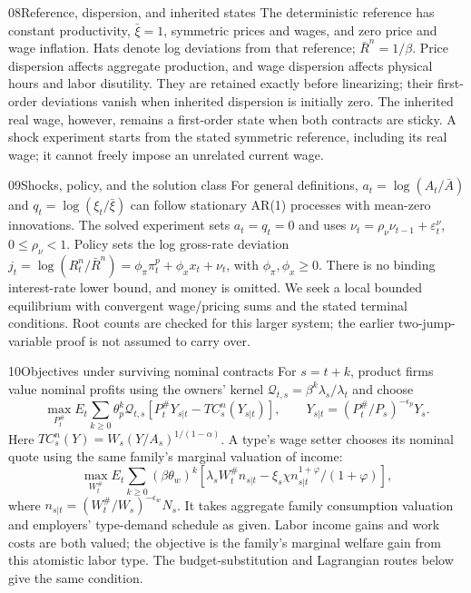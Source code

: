 \begin{modelsetup}[1]
\begin{modelcondition}{08}{Reference, dispersion, and inherited states}
The deterministic reference has constant productivity, $\bar\xi=1$, symmetric
prices and wages, and zero price and wage inflation. Hats denote log deviations
from that reference; $\bar R^n=1/\beta$. Price dispersion affects aggregate
production, and wage dispersion affects physical hours and labor disutility.
They are retained exactly before linearizing; their first-order deviations
vanish when inherited dispersion is initially zero. The inherited real wage,
however, remains a first-order state when both contracts are sticky. A shock
experiment starts from the stated symmetric reference, including its real wage;
it cannot freely impose an unrelated current wage.
\end{modelcondition}
\end{modelsetup}

\begin{modelsetup}[1]
\begin{modelcondition}{09}{Shocks, policy, and the solution class}
For general definitions, $a_t=\log(A_t/\bar A)$ and
$q_t=\log(\xi_t/\bar\xi)$ can follow stationary AR(1) processes with mean-zero
innovations. The solved experiment sets $a_t=q_t=0$ and uses
$\nu_t=\rho_\nu\nu_{t-1}+\varepsilon_t^\nu$, $0\leq\rho_\nu<1$.
Policy sets the log gross-rate deviation
$j_t=\log(R_t^n/\bar R^n)=\phi_\pi\pi_t^p+\phi_xx_t+\nu_t$, with
$\phi_\pi,\phi_x\geq0$. There is no binding interest-rate lower bound, and money
is omitted. We seek a local bounded equilibrium with convergent wage/pricing
sums and the stated terminal conditions. Root counts are checked for this
larger system; the earlier two-jump-variable proof is not assumed to carry over.
\end{modelcondition}
\end{modelsetup}

\begin{modelsetup}[1]
\begin{modelcondition}{10}{Objectives under surviving nominal contracts}
For $s=t+k$, product firms value nominal profits using the owners' kernel
$\mathcal Q_{t,s}=\beta^k\lambda_s/\lambda_t$ and choose
\[
 \max_{P_t^{\#}}E_t\sum_{k\geq0}\theta_p^k\mathcal Q_{t,s}
            [P_t^{\#}Y_{s|t}-TC_s^n(Y_{s|t})],
 \qquad Y_{s|t}=(P_t^{\#}/P_s)^{-\epsilon_p}Y_s.
\]
Here $TC_s^n(Y)=W_s(Y/A_s)^{1/(1-\alpha)}$. A type's wage setter chooses
its nominal quote using the same family's marginal valuation of income:
\[
 \max_{W_t^{\#}}E_t\sum_{k\geq0}(\beta\theta_w)^k
 [\lambda_sW_t^{\#}n_{s|t}-\xi_s\chi n_{s|t}^{1+\varphi}/(1+\varphi)],
\]
where $n_{s|t}=(W_t^{\#}/W_s)^{-\epsilon_w}N_s$. It takes aggregate family
consumption valuation and employers' type-demand schedule as given. Labor
income gains and work costs are both valued; the objective is the family's
marginal welfare gain from this atomistic labor type. The budget-substitution
and Lagrangian routes below give the same condition.
\end{modelcondition}
\end{modelsetup}

